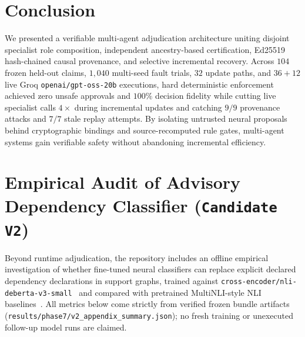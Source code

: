 \documentclass[11pt,a4paper]{article}
\begin{document}
\section{Conclusion}
We presented a verifiable multi-agent adjudication architecture uniting disjoint specialist role composition, independent ancestry-based certification, Ed25519 hash-chained causal provenance, and selective incremental recovery. Across $104$ frozen held-out claims, $1{,}040$ multi-seed fault trials, $32$ update paths, and $36+12$ live Groq \texttt{openai/gpt-oss-20b} executions, hard deterministic enforcement achieved zero unsafe approvals and $100\%$ decision fidelity while cutting live specialist calls $4\times$ during incremental updates and catching $9/9$ provenance attacks and $7/7$ stale replay attempts. By isolating untrusted neural proposals behind cryptographic bindings and source-recomputed rule gates, multi-agent systems gain verifiable safety without abandoning incremental efficiency.

\appendix
\section{Empirical Audit of Advisory Dependency Classifier (\texttt{Candidate V2})}
\label{app:v2}
Beyond runtime adjudication, the repository includes an offline empirical investigation of whether fine-tuned neural classifiers can replace explicit declared dependency declarations in support graphs, trained against \texttt{cross-encoder/nli-deberta-v3-small}~\citep{he2023debertav3} and compared with pretrained MultiNLI-style NLI baselines~\citep{williams2018multinli}. All metrics below come strictly from verified frozen bundle artifacts (\texttt{results/phase7/v2\_appendix\_summary.json}); no fresh training or unexecuted follow-up model runs are claimed.
\end{document}
